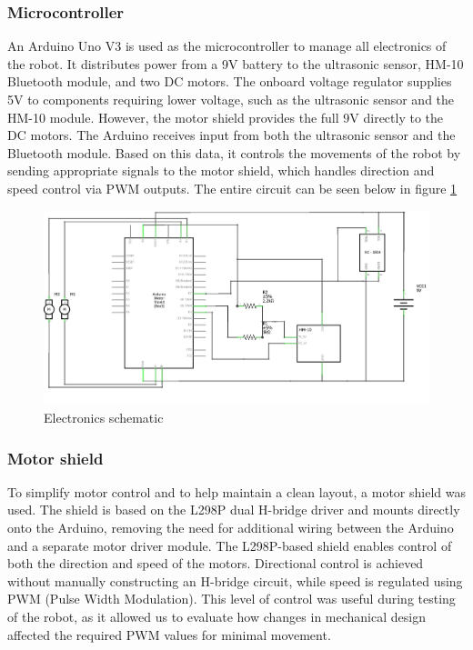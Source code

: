 \subsubsection{Microcontroller}
An Arduino Uno V3 is used as the microcontroller to manage all electronics of the robot. It distributes power from a 9V battery to the ultrasonic sensor, HM-10 Bluetooth module, and two DC motors. The onboard voltage regulator supplies 5V to components requiring lower voltage, such as the ultrasonic sensor and the HM-10 module. However, the motor shield provides the full 9V directly to the DC motors. The Arduino receives input from both the ultrasonic sensor and the Bluetooth module. Based on this data, it controls the movements of the robot by sending appropriate signals to the motor shield, which handles direction and speed control via PWM outputs. The entire circuit can be seen below in figure \ref{fig:Schematic}
\begin{figure} [!htb]
    \centering
    \includegraphics[width=1\linewidth]{images/Amandatory_exam_schem.png}
    \caption{Electronics schematic}
    \label{fig:Schematic}
\end{figure}
\subsubsection{Motor shield}
To simplify motor control and to help maintain a clean layout, a motor shield was used. The shield is based on the L298P dual H-bridge driver and mounts directly onto the Arduino, removing the need for additional wiring between the Arduino and a separate motor driver module. The L298P-based shield enables control of both the direction and speed of the motors. Directional control is achieved without manually constructing an H-bridge circuit, while speed is regulated using PWM (Pulse Width Modulation). This level of control was useful during testing of the robot, as it allowed us to evaluate how changes in mechanical design affected the required PWM values for minimal movement.
\\
